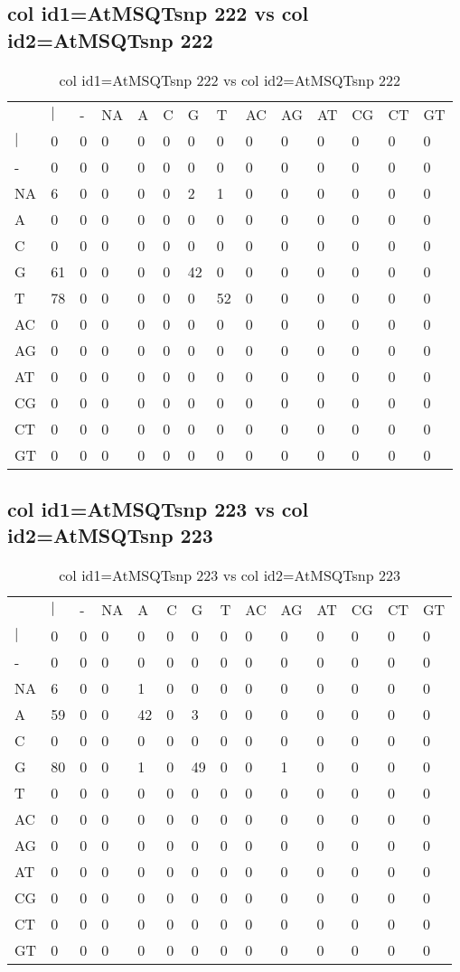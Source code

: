 \subsection{col id1=AtMSQTsnp 222 vs col id2=AtMSQTsnp 222}
\begin{center}
\begin{longtable}{|l|l|l|l|l|l|l|l|l|l|l|l|l|l|}
\caption{col id1=AtMSQTsnp 222 vs col id2=AtMSQTsnp 222} \label{table_dm584}\\
\hline
\\
\hline
&$|$&-&NA&A&C&G&T&AC&AG&AT&CG&CT&GT\\
$|$&0&0&0&0&0&0&0&0&0&0&0&0&0\\
-&0&0&0&0&0&0&0&0&0&0&0&0&0\\
NA&6&0&0&0&0&2&1&0&0&0&0&0&0\\
A&0&0&0&0&0&0&0&0&0&0&0&0&0\\
C&0&0&0&0&0&0&0&0&0&0&0&0&0\\
G&61&0&0&0&0&42&0&0&0&0&0&0&0\\
T&78&0&0&0&0&0&52&0&0&0&0&0&0\\
AC&0&0&0&0&0&0&0&0&0&0&0&0&0\\
AG&0&0&0&0&0&0&0&0&0&0&0&0&0\\
AT&0&0&0&0&0&0&0&0&0&0&0&0&0\\
CG&0&0&0&0&0&0&0&0&0&0&0&0&0\\
CT&0&0&0&0&0&0&0&0&0&0&0&0&0\\
GT&0&0&0&0&0&0&0&0&0&0&0&0&0\\
\hline
\end{longtable}
\end{center}

\subsection{col id1=AtMSQTsnp 223 vs col id2=AtMSQTsnp 223}
\begin{center}
\begin{longtable}{|l|l|l|l|l|l|l|l|l|l|l|l|l|l|}
\caption{col id1=AtMSQTsnp 223 vs col id2=AtMSQTsnp 223} \label{table_dm586}\\
\hline
\\
\hline
&$|$&-&NA&A&C&G&T&AC&AG&AT&CG&CT&GT\\
$|$&0&0&0&0&0&0&0&0&0&0&0&0&0\\
-&0&0&0&0&0&0&0&0&0&0&0&0&0\\
NA&6&0&0&1&0&0&0&0&0&0&0&0&0\\
A&59&0&0&42&0&3&0&0&0&0&0&0&0\\
C&0&0&0&0&0&0&0&0&0&0&0&0&0\\
G&80&0&0&1&0&49&0&0&1&0&0&0&0\\
T&0&0&0&0&0&0&0&0&0&0&0&0&0\\
AC&0&0&0&0&0&0&0&0&0&0&0&0&0\\
AG&0&0&0&0&0&0&0&0&0&0&0&0&0\\
AT&0&0&0&0&0&0&0&0&0&0&0&0&0\\
CG&0&0&0&0&0&0&0&0&0&0&0&0&0\\
CT&0&0&0&0&0&0&0&0&0&0&0&0&0\\
GT&0&0&0&0&0&0&0&0&0&0&0&0&0\\
\hline
\end{longtable}
\end{center}

